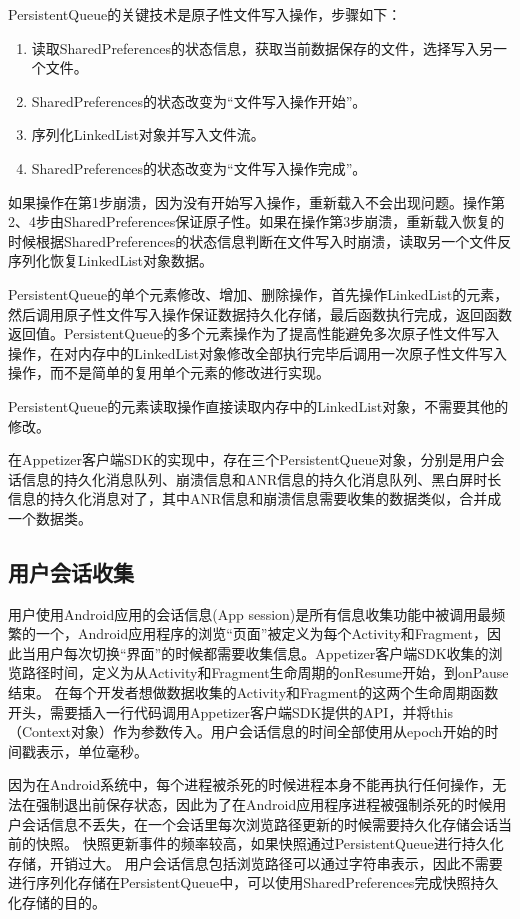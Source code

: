 PersistentQueue的关键技术是原子性文件写入操作，步骤如下：

\begin{enumerate}
	\item 读取SharedPreferences的状态信息，获取当前数据保存的文件，选择写入另一个文件。
	\item SharedPreferences的状态改变为“文件写入操作开始”。
	\item 序列化LinkedList对象并写入文件流。
	\item SharedPreferences的状态改变为“文件写入操作完成”。
\end{enumerate} 

如果操作在第1步崩溃，因为没有开始写入操作，重新载入不会出现问题。操作第2、4步由SharedPreferences保证原子性。如果在操作第3步崩溃，重新载入恢复的时候根据SharedPreferences的状态信息判断在文件写入时崩溃，读取另一个文件反序列化恢复LinkedList对象数据。

PersistentQueue的单个元素修改、增加、删除操作，首先操作LinkedList的元素，然后调用原子性文件写入操作保证数据持久化存储，最后函数执行完成，返回函数返回值。PersistentQueue的多个元素操作为了提高性能避免多次原子性文件写入操作，在对内存中的LinkedList对象修改全部执行完毕后调用一次原子性文件写入操作，而不是简单的复用单个元素的修改进行实现。

PersistentQueue的元素读取操作直接读取内存中的LinkedList对象，不需要其他的修改。

在Appetizer客户端SDK的实现中，存在三个PersistentQueue对象，分别是用户会话信息的持久化消息队列、崩溃信息和ANR信息的持久化消息队列、黑白屏时长信息的持久化消息对了，其中ANR信息和崩溃信息需要收集的数据类似，合并成一个数据类。

\subsection{用户会话收集}
\label{subsec:sessionCollector}

用户使用Android应用的会话信息(App session)是所有信息收集功能中被调用最频繁的一个，Android应用程序的浏览“页面”被定义为每个Activity和Fragment，因此当用户每次切换“界面”的时候都需要收集信息。Appetizer客户端SDK收集的浏览路径时间，定义为从Activity和Fragment生命周期的onResume开始，到onPause结束。
在每个开发者想做数据收集的Activity和Fragment的这两个生命周期函数开头，需要插入一行代码调用Appetizer客户端SDK提供的API，并将this（Context对象）作为参数传入。用户会话信息的时间全部使用从epoch开始的时间戳表示，单位毫秒。

因为在Android系统中，每个进程被杀死的时候进程本身不能再执行任何操作，无法在强制退出前保存状态，因此为了在Android应用程序进程被强制杀死的时候用户会话信息不丢失，在一个会话里每次浏览路径更新的时候需要持久化存储会话当前的快照。
快照更新事件的频率较高，如果快照通过PersistentQueue进行持久化存储，开销过大。
用户会话信息包括浏览路径可以通过字符串表示，因此不需要进行序列化存储在PersistentQueue中，可以使用SharedPreferences完成快照持久化存储的目的。

